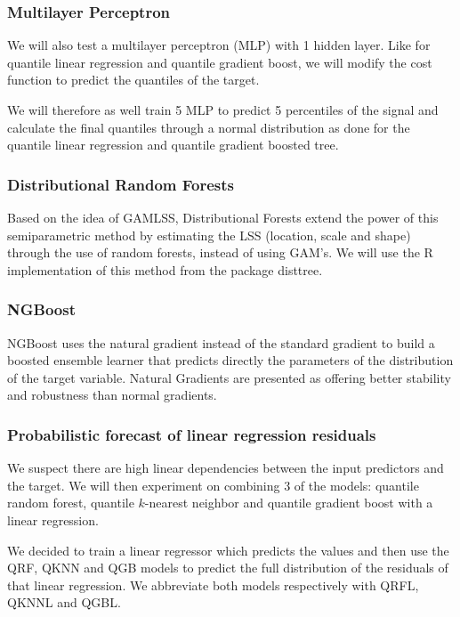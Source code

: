 \documentclass[a4paper,3p,sort&compress]{elsarticle}
\begin{document}
\subsubsection{Multilayer Perceptron}

We will also test a multilayer perceptron (MLP) 
\cite{ramchoun_multilayer_2016} with 1 hidden layer. 
Like for quantile linear regression and quantile gradient boost, 
we will modify the cost function to predict the quantiles of the target.

We will therefore as well train 5 MLP to predict 5 percentiles of the \no signal
and calculate the final quantiles through a normal distribution as done 
for the quantile linear regression 
and quantile gradient boosted tree.

\subsubsection{Distributional Random Forests}

Based on the idea of GAMLSS, Distributional Forests 
\cite{schlosser_distributional_2019} extend the power 
of this semiparametric method by estimating the LSS 
(location, scale and shape) through the use of random forests, 
instead of using GAM's. We will use the R implementation of this 
method from the package disttree.

\subsubsection{NGBoost}

NGBoost \cite{duan_ngboost_2019} uses the natural gradient 
instead of the standard gradient to 
build a boosted ensemble 
learner that predicts directly 
the parameters of the distribution of the target variable.
Natural Gradients are presented as offering better stability and robustness 
than normal gradients.


\subsubsection{Probabilistic forecast of linear regression residuals}

We suspect there are high linear dependencies between the
input predictors and the target. We will then experiment 
on combining 3 of the models: quantile random forest, quantile
$k$-nearest neighbor and quantile gradient boost with a linear regression.

We decided to train a linear regressor which predicts the
\no values and then use the QRF, QKNN and QGB models 
to predict the full distribution of the residuals
of that linear regression. We abbreviate both models respectively with
QRFL, QKNNL and QGBL.
\end{document}
